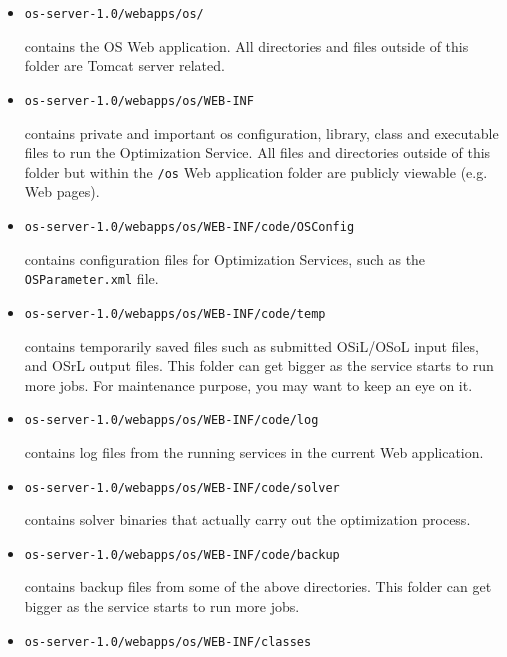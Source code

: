 \documentclass[11pt]{article}
\renewcommand{\_}{{\char"5F}}
\renewcommand{\{}{{\char"7B}}
\renewcommand{\}}{{\char"7D}}
\renewcommand{\^}{{\char"0D}}
\renewcommand{\'}{{\char"0D}}
\begin{document}
\begin{itemize}
\item
\begin{verbatim}
os-server-1.0/webapps/os/
\end{verbatim}
contains the OS Web application. All directories and files outside of this folder are Tomcat server related.
\item
\begin{verbatim}
os-server-1.0/webapps/os/WEB-INF
\end{verbatim}
contains private and important os configuration, library, class and executable files to run the Optimization Service. All files and directories outside of this folder but within the {\tt /os} Web application folder are publicly viewable (e.g. Web pages).
\item
\begin{verbatim}
os-server-1.0/webapps/os/WEB-INF/code/OSConfig
\end{verbatim}
contains configuration files for Optimization Services, such as the {\tt OSParameter.xml} file.
\item
\begin{verbatim}
os-server-1.0/webapps/os/WEB-INF/code/temp
\end{verbatim}
contains temporarily saved files such as submitted OSiL/OSoL input files, and OSrL output files. This folder can get bigger as the service starts to run more jobs. For maintenance purpose, you may want to keep an eye on it.
\item
\begin{verbatim}
os-server-1.0/webapps/os/WEB-INF/code/log
\end{verbatim}
contains log files from the running services in the current Web application.
\item
\begin{verbatim}
os-server-1.0/webapps/os/WEB-INF/code/solver
\end{verbatim}
contains solver binaries that actually carry out the optimization process.
\item
\begin{verbatim}
os-server-1.0/webapps/os/WEB-INF/code/backup
\end{verbatim}
contains backup files from some of the above directories. This folder can get bigger as the service starts to run more jobs. 
\item
\begin{verbatim}
os-server-1.0/webapps/os/WEB-INF/classes
\end{verbatim}

\end{itemize}
\end{document}
